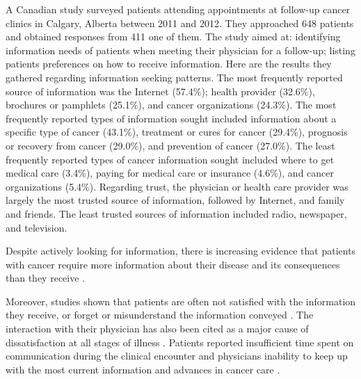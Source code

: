A Canadian study surveyed patients attending appointments at follow-up cancer clinics in Calgary, Alberta \cite{sheabudgell_information_2014} between 2011 and 2012. They approached 648 patients and obtained responses from 411 one of them. The study aimed at: identifying information needs of patients when meeting their physician for a follow-up; listing patients preferences on how to receive information. Here are the results they gathered regarding information seeking patterns. The most frequently reported source of information was the Internet (57.4\%); health provider (32.6\%), brochures or pamphlets (25.1\%), and cancer organizations (24.3\%). The most frequently reported types of information sought included information about a specific type of cancer (43.1\%), treatment or cures for cancer (29.4\%), prognosis or recovery from cancer (29.0\%), and prevention of cancer (27.0\%). The least frequently reported types of cancer information sought included where to get medical care (3.4\%), paying for medical care or insurance (4.6\%), and cancer organizations (5.4\%). Regarding trust, the physician or health care provider was largely the most trusted source of information, followed by Internet, and family and friends. The least trusted sources of information included radio, newspaper, and television.

Despite actively looking for information, there is increasing evidence that patients with cancer require more information about their disease and its consequences than they receive \cite{mcpherson_effective_2001}.

Moreover, studies shown that patients are often not satisfied with the information they receive, or forget or misunderstand the information conveyed \cite{ley_communicating_1988,hogbin_getting_1989}. The interaction with their physician has also been cited as a major cause of dissatisfaction \cite{stewart_effective_1995,bartlett_effects_1984} at all stages of illness \cite{higginson_palliative_1990}. Patients reported insufficient time spent on communication during the clinical encounter and physicians inability to keep up with the most current information and advances in cancer care \cite{anderson_impact_2003}.

